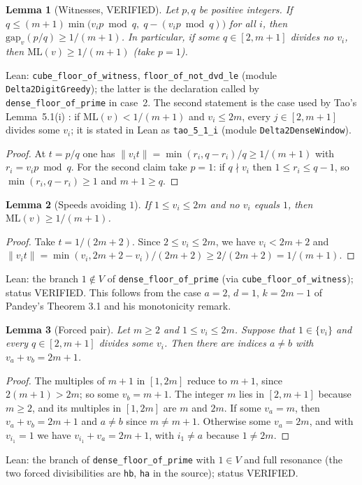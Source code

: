 \documentclass[11pt]{article}
\newtheorem{lemma}{Lemma}
\theoremstyle{remark}
\newcommand{\norm}[1]{\lVert #1\rVert}
\newcommand{\ML}{\mathrm{ML}}
\newcommand{\gap}{\mathrm{gap}}
\begin{document}
\begin{lemma}[Witnesses, VERIFIED]\label{lem:wit}
Let $p,q$ be positive integers. If $q\le (m+1)\min\bigl(v_ip\bmod q,\;q-(v_ip\bmod q)\bigr)$ for all $i$, then $\gap_v(p/q)\ge 1/(m+1)$. In particular, if some $q\in[2,m+1]$ divides no $v_i$, then $\ML(v)\ge1/(m+1)$ (take $p=1$).
\end{lemma}
\noindent Lean: \texttt{cube\_floor\_of\_witness}, \texttt{floor\_of\_not\_dvd\_le} (module \texttt{Delta2DigitGreedy}); the latter is the declaration called by \texttt{dense\_floor\_of\_prime} in case~2. The second statement is the case used by Tao's Lemma~5.1(i) \cite{Tao17}: if $\ML(v)<1/(m+1)$ and $v_i\le 2m$, every $j\in[2,m+1]$ divides some $v_i$; it is stated in Lean as \texttt{tao\_5\_1\_i} (module \texttt{Delta2DenseWindow}).
\begin{proof}
At $t=p/q$ one has $\norm{v_it}=\min(r_i,q-r_i)/q\ge1/(m+1)$ with $r_i=v_ip\bmod q$. For the second claim take $p=1$: if $q\nmid v_i$ then $1\le r_i\le q-1$, so $\min(r_i,q-r_i)\ge1$ and $m+1\ge q$.
\end{proof}

\begin{lemma}[Speeds avoiding $1$]\label{lem:one}
If $1\le v_i\le 2m$ and no $v_i$ equals $1$, then $\ML(v)\ge 1/(m+1)$.
\end{lemma}
\begin{proof}
Take $t=1/(2m+2)$. Since $2\le v_i\le 2m$, we have $v_i<2m+2$ and $\norm{v_it}=\min(v_i,2m+2-v_i)/(2m+2)\ge 2/(2m+2)=1/(m+1)$.
\end{proof}
\noindent Lean: the branch $1\notin V$ of \texttt{dense\_floor\_of\_prime} (via \texttt{cube\_floor\_of\_witness}); status VERIFIED. This follows from the case $a=2$, $d=1$, $k=2m-1$ of Pandey's Theorem 3.1 \cite{Pandey10} and his monotonicity remark.

\begin{lemma}[Forced pair]\label{lem:force}
Let $m\ge2$ and $1\le v_i\le 2m$. Suppose that $1\in\{v_i\}$ and every $q\in[2,m+1]$ divides some $v_i$. Then there are indices $a\ne b$ with $v_a+v_b=2m+1$.
\end{lemma}
\begin{proof}
The multiples of $m+1$ in $[1,2m]$ reduce to $m+1$, since $2(m+1)>2m$; so some $v_b=m+1$. The integer $m$ lies in $[2,m+1]$ because $m\ge2$, and its multiples in $[1,2m]$ are $m$ and $2m$. If some $v_a=m$, then $v_a+v_b=2m+1$ and $a\ne b$ since $m\ne m+1$. Otherwise some $v_a=2m$, and with $v_{i_1}=1$ we have $v_{i_1}+v_a=2m+1$, with $i_1\ne a$ because $1\ne 2m$.
\end{proof}
\noindent Lean: the branch of \texttt{dense\_floor\_of\_prime} with $1\in V$ and full resonance (the two forced divisibilities are \texttt{hb}, \texttt{ha} in the source); status VERIFIED.
\end{document}
